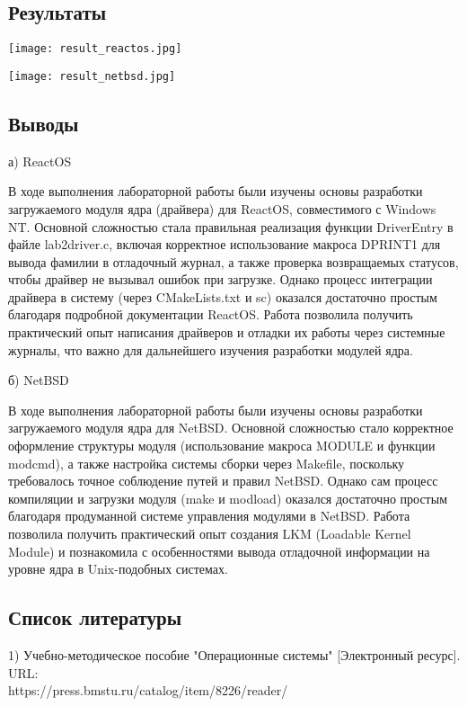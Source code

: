 \documentclass[a4paper, 14pt]{extarticle}
\begin{document}
\vspace{1em}
\begin{center}
\section{Результаты}

\begin{minipage}{\linewidth}
\vspace{50pt}
\centering
\texttt{[image: result\_reactos.jpg]}
\label{fig:result_reactos.jpg}
\end{minipage}

\begin{minipage}{\linewidth}
\vspace{50pt}
\centering
\texttt{[image: result\_netbsd.jpg]}
\label{fig:result_netbsd.jpg}
\end{minipage}

\end{center}

\newpage

\begin{center}
\section{Выводы}
а) ReactOS
\end{center}
В ходе выполнения лабораторной работы были изучены основы разработки загружаемого модуля ядра (драйвера) для ReactOS, совместимого с Windows NT. Основной сложностью стала правильная реализация функции DriverEntry в файле lab2driver.c, включая корректное использование макроса DPRINT1 для вывода фамилии в отладочный журнал, а также проверка возвращаемых статусов, чтобы драйвер не вызывал ошибок при загрузке. Однако процесс интеграции драйвера в систему (через CMakeLists.txt и sc) оказался достаточно простым благодаря подробной документации ReactOS. Работа позволила получить практический опыт написания драйверов и отладки их работы через системные журналы, что важно для дальнейшего изучения разработки модулей ядра.

\begin{center}
б) NetBSD
\end{center}
В ходе выполнения лабораторной работы были изучены основы разработки загружаемого модуля ядра для NetBSD. Основной сложностью стало корректное оформление структуры модуля (использование макроса MODULE и функции modcmd), а также настройка системы сборки через Makefile, поскольку требовалось точное соблюдение путей и правил NetBSD. Однако сам процесс компиляции и загрузки модуля (make и modload) оказался достаточно простым благодаря продуманной системе управления модулями в NetBSD. Работа позволила получить практический опыт создания LKM (Loadable Kernel Module) и познакомила с особенностями вывода отладочной информации на уровне ядра в Unix-подобных системах.


\begin{center}
\section{Список литературы}
\end{center}
1) Учебно-методическое пособие "Операционные системы"  [Электронный ресурс]. URL:\\
https://press.bmstu.ru/catalog/item/8226/reader/\\
\end{document}
